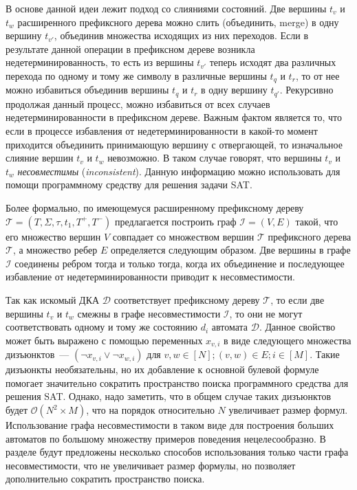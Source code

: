 В основе данной идеи лежит подход со слияниями состояний.
Две вершины $t_{v}$ и $t_{w}$ расширенного префиксного дерева можно слить (объединить, merge) в одну вершину $t_{v'}$, объединив множества исходящих из них переходов.
Если в результате данной операции в префиксном дереве возникла недетерминированность, то есть из вершины $t_{v'}$ теперь исходят два различных перехода по одному и тому же символу в различные вершины $t_{q}$ и $t_{r}$, то от нее можно избавиться объединив вершины $t_{q}$ и $t_{r}$ в одну вершину $t_{q'}$. 
Рекурсивно продолжая данный процесс, можно избавиться от всех случаев недетерминированности в префиксном дереве.
Важным фактом является то, что если в процессе избавления от недетерминированности в какой-то момент приходится объединить принимающую вершину с отвергающей, то изначальное слияние вершин $t_{v}$ и $t_{w}$ невозможно.
В таком случае говорят, что вершины $t_{v}$ и $t_{w}$ \emph{несовместимы} (\emph{inconsistent}).
Данную информацию можно использовать для помощи программному средству для решения задачи SAT.

Более формально, по имеющемуся расширенному префиксному дереву $\mathcal{T} = \left(T,\Sigma,\tau,t_{1},T^{+},T^{-}\right)$ предлагается построить граф $\mathcal{I} = \left(V, E\right)$ такой, что его множество вершин $V$ совпадает со множеством вершин $\mathcal{T}$ префиксного дерева $\mathcal{T}$, а множество ребер $E$ определяется следующим образом. 
Две вершины в графе $\mathcal{I}$ соединены ребром тогда и только тогда, когда их объединение и последующее избавление от недетерминированности приводит к несовместимости. 

Так как искомый ДКА $\mathcal{D}$ соответствует префиксному дереву $\mathcal{T}$, то если две вершины $t_{v}$ и $t_{w}$ смежны в графе несовместимости $\mathcal{I}$, то они не могут соответствовать одному и тому же состоянию $d_{i}$ автомата $\mathcal{D}$.
Данное свойство может быть выражено с помощью переменных $x_{v,i}$ в виде следующего множества дизъюнктов~{---} $\left(\neg x_{v,i} \vee \neg x_{w,i}\right)$ для $v,w \in \left[N\right]; \left(v,w\right) \in E; i \in \left[M\right]$.
Такие дизъюнкты необязательны, но их добавление к основной булевой формуле помогает значительно сократить пространство поиска программного средства для решения SAT. 
Однако, надо заметить, что в общем случае таких дизъюнктов будет $\mathcal{O}\left(N^{2} \times M\right)$, что на порядок относительно $N$ увеличивает размер формул. 
Использование графа несовместимости в таком виде для построения больших автоматов по большому множеству примеров поведения нецелесообразно. 
В разделе  будут предложены несколько способов использования только части графа несовместимости, что не увеличивает размер формулы, но позволяет дополнительно сократить пространство поиска.

